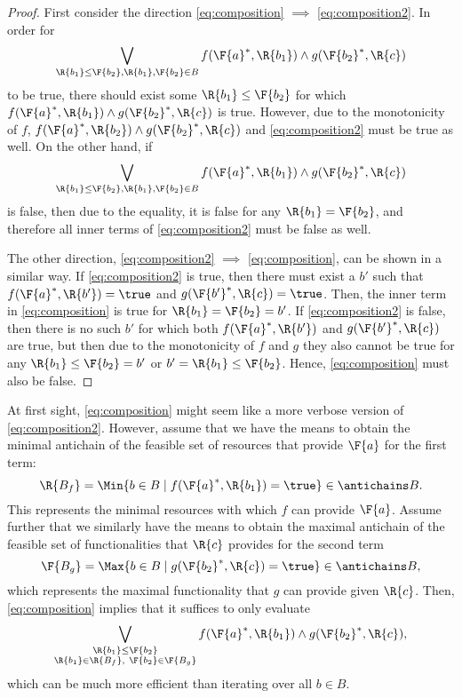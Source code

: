 \begin{proof}
First consider the direction \cref{eq:composition} $\implies$ \cref{eq:composition2}. In order for 
\begin{equation}
    \bigvee_{\R{b_1}\leq\F{b_2}, \R{b_1},\F{b_2}\in B} f(\F{a}^*,\R{b_1}) \wedge g(\F{b_2}^*,\R{c})
\end{equation} to be true, there should exist some $\R{b_1}\leq \F{b_2}$ for which $f(\F{a}^*,\R{b_1}) \wedge g(\F{b_2}^*,\R{c})$ is true. However, due to the monotonicity of $f$, $f(\F{a}^*,\R{b_2}) \wedge g(\F{b_2}^*,\R{c})$ and \cref{eq:composition2} must be true as well. On the other hand, if
\begin{equation}
    \bigvee_{\R{b_1}\leq\F{b_2}, \R{b_1},\F{b_2}\in B} f(\F{a}^*,\R{b_1}) \wedge g(\F{b_2}^*,\R{c})
\end{equation} is false, then due to the equality, it is false for any $\R{b_1}=\F{b_2}$, and therefore all inner terms of \cref{eq:composition2} must be false as well.

The other direction, \cref{eq:composition2} $\implies$ \cref{eq:composition}, can be shown in a similar way. If \cref{eq:composition2} is true, then there must exist a $b'$ such that $f(\F{a}^*, \R{b'})=\true$ and $g(\F{b'}^*, \R{c})=\true$. Then, the inner term in \cref{eq:composition} is true for $\R{b_1}=\F{b_2}=b'$. If \cref{eq:composition2} is false, then there is no such $b'$ for which both $f(\F{a}^*, \R{b'})$ and $g(\F{b'}^*, \R{c})$ are true, but then due to the monotonicity of $f$ and $g$ they also cannot be true for any $\R{b_1} \leq \F{b_2} = b'$ or $b'=\R{b_1} \leq \F{b_2}$. Hence, \cref{eq:composition} must also be false.
\end{proof}
\begin{remark}
At first sight, \cref{eq:composition} might seem like a more verbose version of \cref{eq:composition2}. However, assume that we have the means to obtain the minimal antichain of the feasible set of resources that provide $\F{a}$ for the first term:
\begin{equation}
    \R{B_f} = \Min \{b\in B \mid f(\F{a}^*,\R{b_1})=\true\} \in \antichains B.
\end{equation}
This represents the minimal resources with which $f$ can provide $\F{a}$. Assume further that we similarly have the means to obtain the maximal antichain of the feasible set of functionalities that $\R{c}$ provides for the second term
\begin{equation}
    \F{B_g} = \Max \{b\in B \mid g(\F{b_2}^*,\R{c})=\true\} \in \antichains B,
\end{equation}
which represents the maximal functionality that $g$ can provide given $\R{c}$. Then, \cref{eq:composition} implies that it suffices to only evaluate
\begin{equation}
    \bigvee_{\substack{\R{b_1}\leq\F{b_2} \\ \R{b_1}\in \R{B_f},~ \F{b_2}\in\F{B_g} }} f(\F{a}^*,\R{b_1}) \wedge g(\F{b_2}^*,\R{c}),
\end{equation}
which can be much more efficient than iterating over all $b\in B$.
\end{remark}


